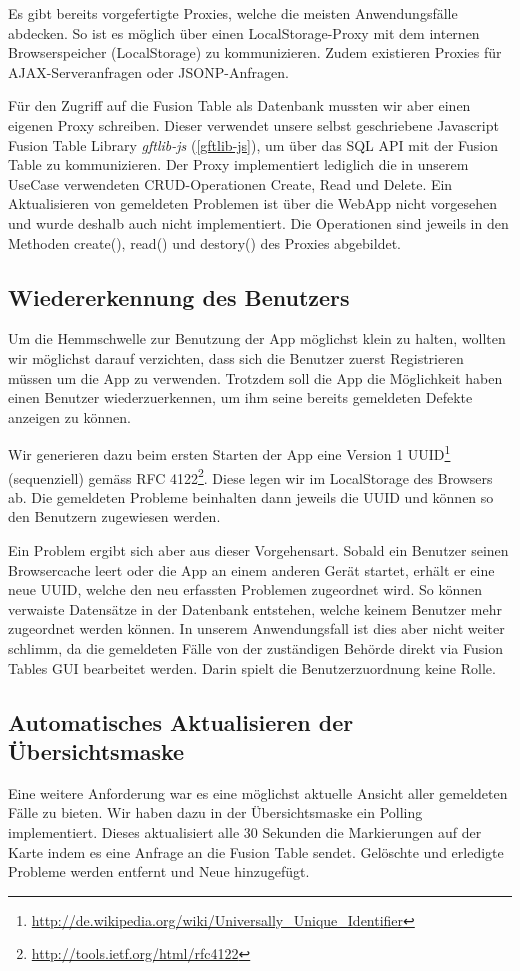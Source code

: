 Es gibt bereits vorgefertigte Proxies, welche die meisten Anwendungsfälle abdecken. So ist es möglich über einen LocalStorage-Proxy mit dem internen Browserspeicher (LocalStorage) zu kommunizieren. Zudem existieren Proxies für AJAX-Serveranfragen oder JSONP-Anfragen.

Für den Zugriff auf die Fusion Table als Datenbank mussten wir aber einen eigenen Proxy schreiben. Dieser verwendet unsere selbst geschriebene Javascript Fusion Table Library \emph{gftlib-js} (\ref{gftlib-js}), um über das SQL API mit der Fusion Table zu kommunizieren.
Der Proxy implementiert lediglich die in unserem UseCase verwendeten CRUD-Operationen Create, Read und Delete. Ein Aktualisieren von gemeldeten Problemen ist über die WebApp nicht vorgesehen und wurde deshalb auch nicht implementiert.
Die Operationen sind jeweils in den Methoden create(), read() und destory() des Proxies abgebildet.

\subsection{Wiedererkennung des Benutzers}
Um die Hemmschwelle zur Benutzung der App möglichst klein zu halten, wollten wir möglichst darauf verzichten, dass sich die Benutzer zuerst Registrieren müssen um die App zu verwenden. Trotzdem soll die App die Möglichkeit haben einen Benutzer wiederzuerkennen, um ihm seine bereits gemeldeten Defekte anzeigen zu können.

Wir generieren dazu beim ersten Starten der App eine Version 1 UUID\footnote{\url{http://de.wikipedia.org/wiki/Universally_Unique_Identifier}} (sequenziell) gemäss RFC 4122\footnote{\url{http://tools.ietf.org/html/rfc4122}}. Diese legen wir im LocalStorage des Browsers ab. Die gemeldeten Probleme beinhalten dann jeweils die UUID und können so den Benutzern zugewiesen werden.

Ein Problem ergibt sich aber aus dieser Vorgehensart. Sobald ein Benutzer seinen Browsercache leert oder die App an einem anderen Gerät startet, erhält er eine neue UUID, welche den neu erfassten Problemen zugeordnet wird. So können verwaiste Datensätze in der Datenbank entstehen, welche keinem Benutzer mehr zugeordnet werden können. In unserem Anwendungsfall ist dies aber nicht weiter schlimm, da die gemeldeten Fälle von der zuständigen Behörde direkt via Fusion Tables GUI bearbeitet werden. Darin spielt die Benutzerzuordnung keine Rolle.

\subsection{Automatisches Aktualisieren der Übersichtsmaske}
Eine weitere Anforderung war es eine möglichst aktuelle Ansicht aller gemeldeten Fälle zu bieten. Wir haben dazu in der Übersichtsmaske ein Polling implementiert. Dieses aktualisiert alle 30 Sekunden die Markierungen auf der Karte indem es eine Anfrage an die Fusion Table sendet. Gelöschte und erledigte Probleme werden entfernt und Neue hinzugefügt.

